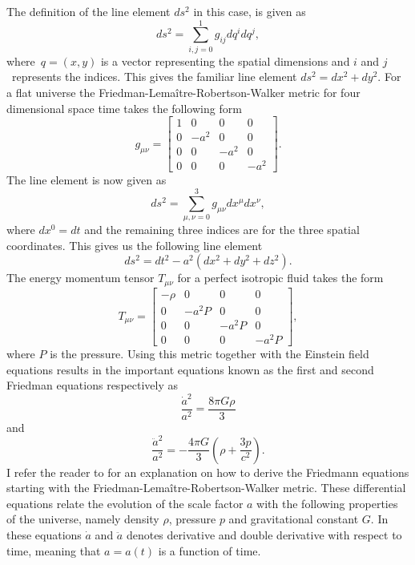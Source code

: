 The definition of the line element $ds^2$ in this case, is given as
\begin{equation}
    ds^2 = \sum_{i,j=0}^1g_{ij}dq^idq^j,
\end{equation}
where $q=(x, y)$ is a vector representing the spatial dimensions and $i$ and $j$ represents the indices.
This gives the familiar line element $ds^2=dx^2+dy^2$.
For a flat universe the Friedman-Lemaître-Robertson-Walker metric for four dimensional space time takes the following form
\begin{equation}
    g_{\mu\nu}=
    \begin{bmatrix}
        1 & 0 & 0 & 0\\
        0 & -a^2 & 0 & 0\\
        0 & 0 & -a^2 & 0\\
        0 & 0 & 0 & -a^2 
    \end{bmatrix}.
\end{equation}
The line element is now given as 
\begin{equation}
    ds^2 = \sum_{\mu,\nu=0}^3g_{\mu\nu}dx^\mu dx^\nu,
\end{equation}
where $dx^0=dt$ and the remaining three indices are for the three spatial coordinates.
This gives us the following line element
\begin{equation}
    ds^2 = dt^2 -a^2(dx^2 + dy^2 + dz^2).
\end{equation}
The energy momentum tensor $T_{\mu\nu}$ for a perfect isotropic fluid takes the
form
\begin{equation}
    T_{\mu\nu}=
    \begin{bmatrix}
        -\rho & 0 & 0 & 0\\
        0 & -a^2P & 0 & 0\\
        0 & 0 & -a^2P & 0\\
        0 & 0 & 0 & -a^2P 
    \end{bmatrix},
\end{equation}
where $P$ is the pressure.
Using this metric together with the Einstein field equations results in the important
equations known as the first and second Friedman equations respectively as
\begin{equation}\label{eq:F1}
    \frac{\dot{a}^2}{a^2} = \frac{8\pi G\rho}{3}
\end{equation}
and
\begin{equation}\label{eq:FII}
    \frac{\ddot{a}^2}{a^2} = -\frac{4\pi G}{3}(\rho + \frac{3p}{c^2}).
\end{equation}
I refer the reader to \cite[ch. 2]{Dodelson:1282338} for an explanation on how to derive the Friedmann equations starting with the Friedman-Lemaître-Robertson-Walker metric.
These differential equations relate the evolution of the scale factor $a$ with the
following properties of the universe, namely density $\rho$, pressure $p$ and gravitational
constant $G$. In these equations $\dot{a}$ and $\ddot{a}$ denotes
derivative and double derivative with respect to time, meaning that $a=a(t)$ is a
function of time. \\

